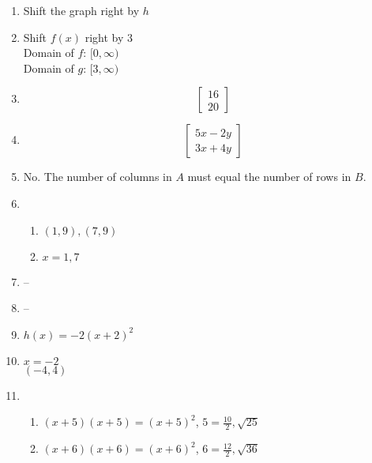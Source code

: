 \documentclass{article}
\begin{document}
\begin{enumerate}
\item Shift the graph right by $h$

\item Shift $f(x)$ right by 3 \\
	Domain of $f$: $[0, \infty)$ \\
	Domain of $g$: $[3, \infty)$ 
	
\item
	\begin{equation*}
	\begin{bmatrix}
	16 \\
	20
	\end{bmatrix}
	\end{equation*}
	
\item
	\begin{equation*}
	\begin{bmatrix}
	5x - 2y \\
	3x + 4y
	\end{bmatrix}
	\end{equation*}
	
\item No. The number of columns in $A$ must equal the number of rows in $B$.

\item

	\begin{enumerate}
	
	\item $(1,9), (7,9)$
	
	\item $x = 1, 7$

	\end{enumerate}
	
\item --

\item --

\item $h(x) = -2(x + 2)^2$

\item $x = -2$ \\
	$(-4, 4)$
	
\item
	
	\begin{enumerate}
	
	\item $(x + 5)(x + 5) = (x +5)^2$, $5 = \frac{10}{2}, \sqrt{25}$
	
	\item $(x + 6)(x + 6) = (x + 6)^2$, $6 = \frac{12}{2}, \sqrt{36}$
	

\end{enumerate}
\end{enumerate}
\end{document}
